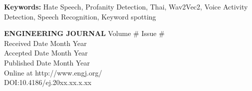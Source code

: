 \documentclass[11pt,a4paper]{article}
\begin{document}
{\flushleft \textbf{Keywords:} Hate Speech, Profanity Detection, Thai, Wav2Vec2, Voice Activity Detection, Speech Recognition, Keyword spotting}

\vfill
\begin{flushleft}
\textbf{ENGINEERING JOURNAL} Volume \# Issue \# \\
Received Date Month Year \\
Accepted Date Month Year \\
Published Date Month Year \\
Online at http://www.engj.org/ \\
DOI:10.4186/ej.20xx.xx.x.xx
\end{flushleft}

\newpage


\pagestyle{fancy}
\fancyhead{}
\fancyfoot{}
\end{document}
